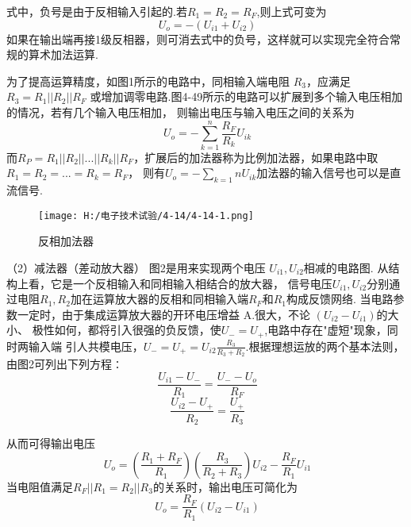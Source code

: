 \documentclass{article}
\begin{document}
            式中，负号是由于反相输入引起的.若$R_1=R_2=R_F$,则上式可变为
            \begin{equation*}
                \ U_o=-(U_{i1}+U_{i2})
               \end{equation*}
如果在输出端再接1级反相器，则可消去式中的负号，这样就可以实现完全符合常规的算术加法运算.\par 
为了提高运算精度，如图1所示的电路中，同相输入端电阻 $R_3$，应满足$R_3=R_1||R_2||R_F$
或增加调零电路.图4-49所示的电路可以扩展到多个输入电压相加的情况，若有几个输入电压相加，
则输出电压与输入电压之间的关系为
\begin{equation*}
    \ U_o=-\sum_{k = 1}^{n}  \frac{R_F}{R_k}U_{ik}
   \end{equation*}
   而$R_P=R_1||R_2||...||R_k||R_F$，扩展后的加法器称为比例加法器，如果电路中取$R_1=R_2=...=R_k=R_F$，
   则有$U_o=-\sum_{k=1}{n}U_{ik}$加法器的输入信号也可以是直流信号.\par 
   \begin{figure}[h]
    \centering
    \texttt{[image: H:/电子技术试验/4-14/4-14-1.png]}
    \caption{反相加法器} \label{fig:aa}
\end{figure}\par 
   （2）减法器（差动放大器）
   图2是用来实现两个电压 $U_{i1},U_{i2}$相减的电路图. 从结构上看，它是一个反相输入和同相输入相结合的放大器，
   信号电压$U_{i1},U_{i2}$分别通过电阻$R_1,R_2$加在运算放大器的反相和同相输入端$R_F$和$R_1$构成反馈网络.
   当电路参数一定时，由于集成运算放大器的开环电压增益 A.很大，不论 $(U_{i2}-U_{i1})$的大小、
   极性如何，都将引入很强的负反馈，使$U_-=U_+$,电路中存在"虚短"现象，同时两输入端
   引人共模电压，$U_-=U_+=U_{i2}\frac{R_3}{R_3+R_2}$.根据理想运放的两个基本法则，由图2可列出下列方程∶
   \begin{equation*}
    \ \frac{U_{i1}-U_{-}}{R_1}=\frac{U_{-}-U_{o}}{R_F}
   \end{equation*}
   \begin{equation*}
    \ \frac{U_{i2}-U_{+}}{R_2}=\frac{U_+}{R_3}
   \end{equation*}

   从而可得输出电压
   \begin{equation*}
  \  U_o=(\frac{R_1+R_F}{R_1})(\frac{R_3}{R_2+R_3})U_{i2}-\frac{R_F}{R_1}U_{i1}
\end{equation*}
   当电阻值满足$R_F||R_1=R_2||R_3$的关系时，输出电压可简化为
   \begin{equation*}
    \  U_o=\frac{R_F}{R_1}(U_{i2}-U_{i1})
  \end{equation*}
  
\end{document}
